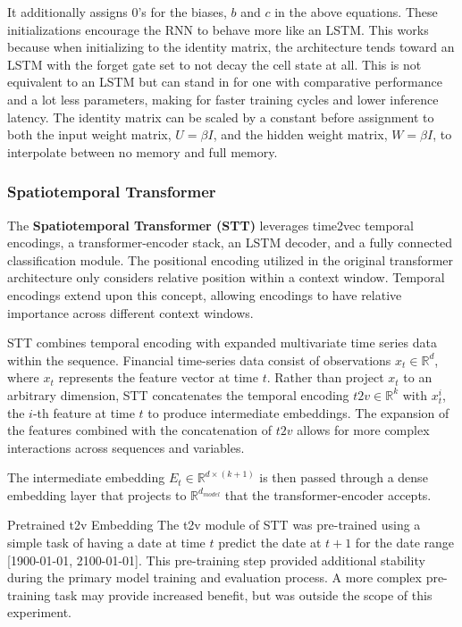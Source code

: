 \documentclass[10pt,twocolumn,letterpaper]{article}
\begin{document}
    It additionally assigns 0’s for the biases, $b$ and $c$ in the above equations. These initializations encourage the RNN to behave more like an LSTM. This works because when initializing to the identity matrix, the architecture tends toward an LSTM with the forget gate set to not decay the cell state at all. This is not equivalent to an LSTM but can stand in for one with comparative performance and a lot less parameters, making for faster training cycles and lower inference latency. The identity matrix can be scaled by a constant before assignment to both the input weight matrix, $U = \beta I$, and the hidden weight matrix, $W= \beta I$, to interpolate between no memory and full memory.

    \subsubsection{Spatiotemporal Transformer}

    The \textbf{Spatiotemporal Transformer (STT)} leverages time2vec temporal encodings, a transformer-encoder stack, an LSTM decoder, and a fully connected classification module. The positional encoding utilized in the original transformer architecture only considers relative position within a context window. Temporal encodings extend upon this concept, allowing encodings to have relative importance across different context windows\cite{STT_Paper,time2vec,STLAT_sota,vaswani_attention_2023,BERT}.

STT combines temporal encoding with expanded multivariate time series data within the sequence. Financial time-series data consist of observations $x_t \in \mathbb{R}^d$, where $x_t$ represents the feature vector at time $t$. Rather than project $x_t$ to an arbitrary dimension, STT concatenates the temporal encoding $t2v \in \mathbb{R}^k$ with $x^i_t$, the $i$-th feature at time $t$ to produce intermediate embeddings. The expansion of the features combined with the concatenation of $t2v$ allows for more complex interactions across sequences and variables.

            The intermediate embedding $E_t \in \mathbb{R}^{d \times (k + 1)}$ is then passed through a dense embedding layer that projects to $\mathbb{R}^{d_{model}}$ that the transformer-encoder accepts.

Pretrained t2v Embedding
The t2v module of STT was pre-trained using a simple task of having a date at time $t$ predict the date at $t+1$ for the date range [1900-01-01, 2100-01-01]. This pre-training step provided additional stability during the primary model training and evaluation process. A more complex pre-training task may provide increased benefit, but was outside the scope of this experiment.
\end{document}
